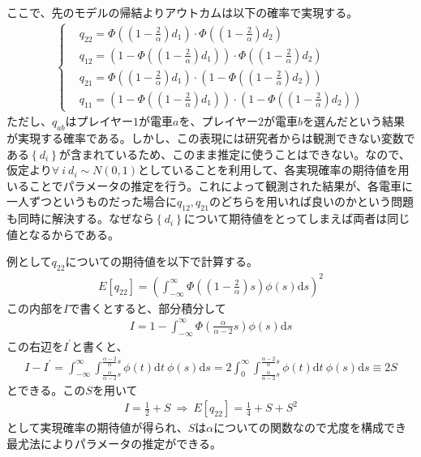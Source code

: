 \documentclass{jsarticle}
\begin{document}
ここで、先のモデルの帰結よりアウトカムは以下の確率で実現する。
\begin{align*}
	\begin{cases}
	&q_{22} = \Phi((1 - \frac{2}{\alpha})d_1) \cdot \Phi((1 - \frac{2}{\alpha})d_2)\\[8pt]
	&q_{12} = (1 - \Phi((1 - \frac{2}{\alpha})d_1)) \cdot \Phi((1 - \frac{2}{\alpha})d_2)\\[8pt]
	&q_{21} = \Phi((1 - \frac{2}{\alpha})d_1) \cdot (1 - \Phi((1 - \frac{2}{\alpha})d_2))\\[8pt]
	&q_{11} = (1 - \Phi((1 - \frac{2}{\alpha})d_1)) \cdot (1 - \Phi((1 - \frac{2}{\alpha})d_2))
	\end{cases}
\end{align*}
ただし、$q_{ab}$はプレイヤー$1$が電車$a$を、プレイヤー$2$が電車$b$を選んだという結果が実現する確率である。しかし、この表現には研究者からは観測できない変数である$\left\{ d_i\right\}$が含まれているため、このまま推定に使うことはできない。なので、仮定より$\forall \ i\ d_i \sim N(0,1)$としていることを利用して、各実現確率の期待値を用いることでパラメータの推定を行う。これによって観測された結果が、各電車に一人ずつというものだった場合に$q_{12}, q_{21}$のどちらを用いれば良いのかという問題も同時に解決する。なぜなら$\left\{ d_i\right\}$について期待値をとってしまえば両者は同じ値となるからである。

例として$q_{22}$についての期待値を以下で計算する。
\begin{align*}
	E[q_{22}] = \left( \int_{-\infty}^{\infty} \Phi \left(\left(1 - \frac{2}{\alpha}\right)s\right) \phi(s) \mathrm{d}s \right)^2
\end{align*}
この内部を$I$で書くとすると、部分積分して
\begin{align*}
	I = 1 - \int_{-\infty}^{\infty} \Phi \left(\frac{\alpha}{\alpha - 2} s\right)\phi(s)\mathrm{d}s
\end{align*}
この右辺を$I^{'}$と書くと、
\begin{align*}
	I - I^{'} = \int_{-\infty}^{\infty} \int_{\frac{\alpha}{\alpha - 2}s}^{\frac{\alpha - 2}{\alpha}s} \phi(t) \mathrm{d}t\ \phi (s) \mathrm{d}s = 2\int_0^{\infty}  \int_{\frac{\alpha}{\alpha - 2}s}^{\frac{\alpha - 2}{\alpha}s} \phi(t) \mathrm{d}t\ \phi (s) \mathrm{d}s \equiv 2S
\end{align*}
とできる。この$S$を用いて
\begin{align*}
	I = \frac{1}{2} + S\ \Rightarrow\ E[q_{22}] = \frac{1}{4} + S + S^2
\end{align*}
として実現確率の期待値が得られ、$S$は$\alpha$についての関数なので尤度を構成でき最尤法によりパラメータの推定ができる。
\end{document}
